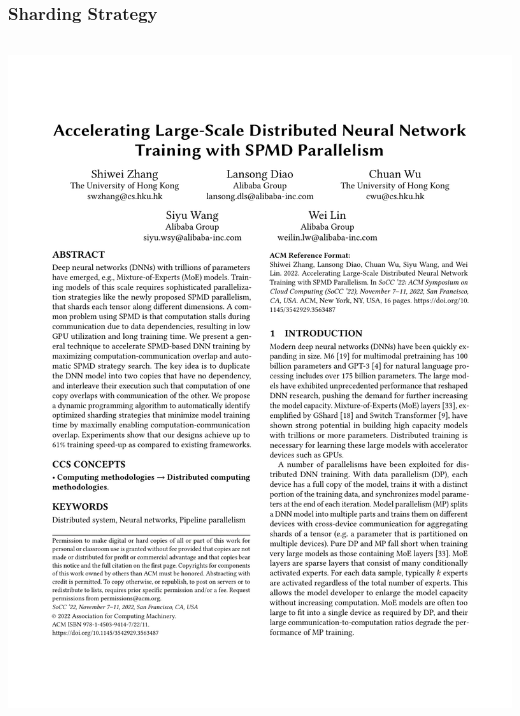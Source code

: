 \documentclass[12pt,aspectratio=169]{beamer}
\begin{document}
    \begin{frame}
        \frametitle{Sharding Strategy}

        \begin{columns}
            \begin{column}{0.5\textwidth}
                {
                \centering
                \includegraphics[page=8,trim=2.2cm 20cm 11.2cm 2.8cm,clip,scale=0.84]{paper.pdf}
                }


\end{column}
\end{columns}
\end{frame}
\end{document}

